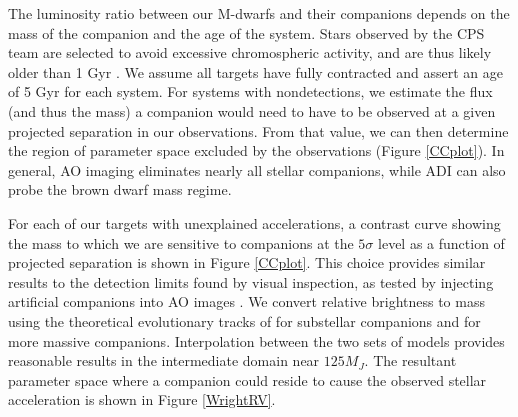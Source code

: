 The luminosity ratio between our M-dwarfs and their companions depends on the mass of the companion and the age of the system. Stars observed by the CPS team are selected to avoid excessive chromospheric activity, and are thus likely older than 1 Gyr \citep{Wright05}. We assume all targets have fully contracted and assert an age of 5 Gyr for each system. For systems with nondetections, we estimate the flux (and thus the mass) a companion would need to have to be observed at a given projected separation in our observations. From that value, we can then determine the region of parameter space excluded by the observations (Figure \ref{CCplot}). In general, AO imaging eliminates nearly all stellar companions, while ADI can also probe the brown dwarf mass regime.

For each of our targets with unexplained accelerations, a contrast curve showing the mass to which we are sensitive to companions at the $5\sigma$ level as a function of projected separation is shown in Figure \ref{CCplot}. This choice provides similar results to the detection limits found by visual inspection, as tested by injecting artificial companions into AO images \citep{Metchev09}. We convert relative brightness to mass using the theoretical evolutionary tracks of \citet{Baraffe03} for substellar companions and \citet{Girardi02} for more massive companions. Interpolation between the two sets of models provides reasonable results in the intermediate domain near $125 M_J$. The resultant parameter space where a companion could reside to cause the observed stellar acceleration is shown in Figure \ref{WrightRV}. 



